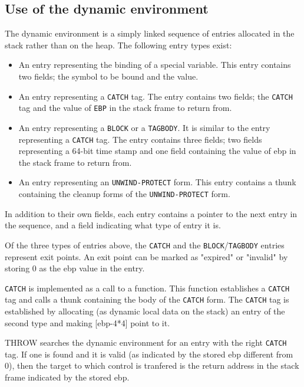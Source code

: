 \subsection{Use of the dynamic environment}

The dynamic environment is a simply linked sequence of entries
allocated in the stack rather than on the heap.  The following entry
types exist:

\begin{itemize}
  \item An entry representing the binding of a special variable.  This
    entry contains two fields; the symbol to be bound and the value.

  \item An entry representing a \texttt{CATCH} tag.  The entry
    contains two fields; the \texttt{CATCH} tag and the value of
    \texttt{EBP} in the stack frame to return from.

  \item An entry representing a \texttt{BLOCK} or a \texttt{TAGBODY}.
    It is similar to the entry representing a \texttt{CATCH} tag.  The
    entry contains three fields; two fields representing a 64-bit time
    stamp and one field containing the value of ebp in the stack frame
    to return from.

  \item An entry representing an \texttt{UNWIND-PROTECT} form.  This
    entry contains a thunk containing the cleanup forms of the
    \texttt{UNWIND-PROTECT} form.

\end{itemize}

In addition to their own fields, each entry contains a pointer to the
next entry in the sequence, and a field indicating what type of entry
it is.

Of the three types of entries above, the \texttt{CATCH} and the
\texttt{BLOCK}/\texttt{TAGBODY} entries represent exit points.  An
exit point can be marked as "expired" or "invalid" by storing 0 as the
ebp value in the entry.

\texttt{CATCH} is implemented as a call to a function.  This function
establishes a \texttt{CATCH} tag and calls a thunk containing the body
of the \texttt{CATCH} form.  The \texttt{CATCH} tag is established by
allocating (as dynamic local data on the stack) an entry of the second
type and making [ebp-4*4] point to it.

THROW searches the dynamic environment for an entry with the right
\texttt{CATCH} tag.  If one is found and it is valid (as indicated by
the stored ebp different from 0), then the target to which control is
tranfered is the return address in the stack frame indicated by the
stored ebp.

